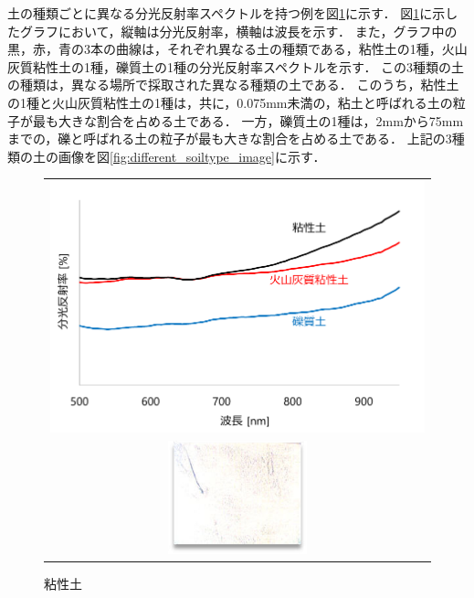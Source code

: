 土の種類ごとに異なる分光反射率スペクトルを持つ例を図\ref{fig:spectrum_for_different_soiltype}に示す．
図\ref{fig:spectrum_for_different_soiltype}に示したグラフにおいて，縦軸は分光反射率，横軸は波長を示す．
また，グラフ中の黒，赤，青の3本の曲線は，それぞれ異なる土の種類である，粘性土の1種，火山灰質粘性土の1種，礫質土の1種の分光反射率スペクトルを示す．
この3種類の土の種類は，異なる場所で採取された異なる種類の土である．
このうち，粘性土の1種と火山灰質粘性土の1種は，共に，0.075mm未満の，粘土と呼ばれる土の粒子が最も大きな割合を占める土である．
一方，礫質土の1種は，2mmから75mmまでの，礫と呼ばれる土の粒子が最も大きな割合を占める土である．%
上記の3種類の土の画像を図\ref{fig:different_soiltype_image}に示す．

\begin{figure}[p]
	\begin{center}
		\begin{tabular}{c}

			\begin{minipage}[t]{\linewidth}
			\includegraphics[width=13cm]{./Ch3_SoilTypeDiscrimination/Fig/spectrum_for_different_soiltype_compressed.pdf}
			\caption{土の種類ごとに異なる分光反射率スペクトル}\label{fig:spectrum_for_different_soiltype}
			\vspace{2cm}
			\end{minipage}

			\\

			\begin{minipage}[t]{0.33\linewidth}
			\includegraphics[width=4cm]{./Ch3_SoilTypeDiscrimination/Fig/A_Fu_image_compressed.pdf}
			\caption*{粘性土}
			\end{minipage}


\end{tabular}
\end{center}
\end{figure}
